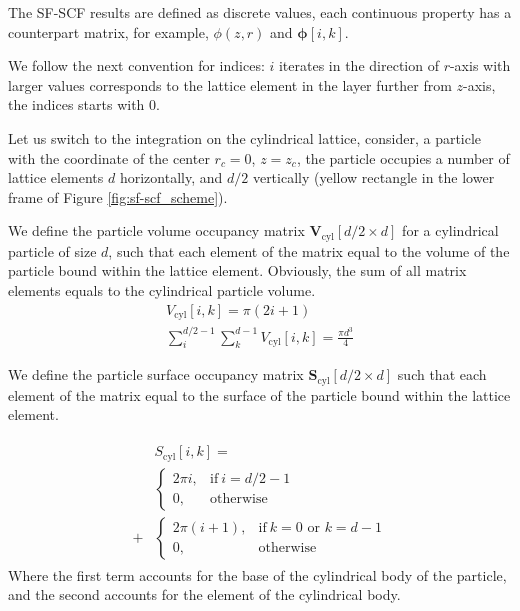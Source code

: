 \documentclass[12pt, a4paper]{article}
\begin{document}
The SF-SCF results are defined as discrete values, each continuous property has a counterpart matrix, for example, $\phi(z,r)$ and $\bm{\phi}[i,k]$.

We follow the next convention for indices: $i$ iterates in the direction of $r$-axis with larger values corresponds to the lattice element in the layer further from $z$-axis, the indices starts with $0$.

Let us switch to the integration on the cylindrical lattice, consider, a particle with the coordinate of the center $r_c=0$, $z = z_{c}$, the particle occupies a number of lattice elements $d$ horizontally, and $d/2$ vertically (yellow rectangle in the lower frame of Figure \ref{fig:sf-scf_scheme}).

We define the particle volume occupancy matrix $\mathbf{V}_{\textrm{cyl}}[d/2 \times d]$ for a cylindrical particle of size $d$, such that each element of the matrix equal to the volume of the particle bound within the lattice element.
Obviously, the sum of all matrix elements equals to the cylindrical particle volume.
\begin{eqnarray}
    V_{\textrm{cyl}}[i, k] = \pi(2i + 1)
    \\
    \sum_{i}^{d/2-1} \sum_{k}^{d-1} V_{\textrm{cyl}}[i, k] = \frac{\pi d^3}{4}
\end{eqnarray}

We define the particle surface occupancy matrix  $\mathbf{S}_{\textrm{cyl}}[d/2 \times d]$ such that each element of the matrix equal to the surface of the particle bound within the lattice element.


\begin{align}
\begin{split}
    &S_{\textrm{cyl}}[i,k] = 
    \\
    &\begin{cases}
        2 \pi i,   & \text{if}\ i=d/2-1 \\
        0,         & \text{otherwise}
    \end{cases}
    \\
    +
    &\begin{cases}
        2\pi(i+1), & \text{if}\ k=0 \text{ or } k=d-1 \\
        0,         & \text{otherwise}
    \end{cases}
\end{split}
\end{align}
Where the first term accounts for the base of the cylindrical body of the particle, and the second accounts for the element of the cylindrical body.
\end{document}
